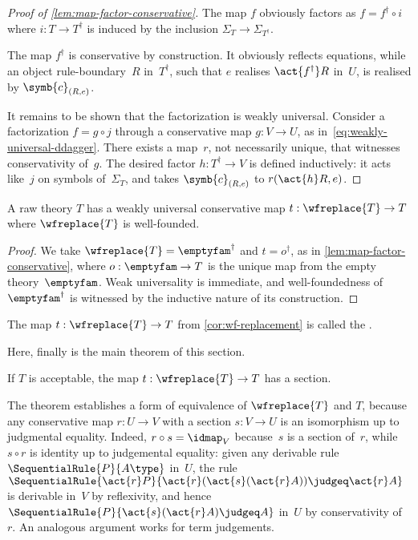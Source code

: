 \begin{proof}[Proof of \cref{lem:map-factor-conservative}]
  The map $f$ obviously factors as $f = f^\dagger \circ i$ where $i : T \to T^\dagger$ is induced by the inclusion $\Sigma_T \to \Sigma_{T^\dagger}$.

  The map $f^\dagger$ is conservative by construction. It obviously reflects equations, while an object rule-boundary~$R$
  in~$T^\dagger$, such that $e$ realises $\act{f^\dagger} R$ in~$U$, is realised by $\symb{c}_{(R, e)}$.

  It remains to be shown that the factorization is weakly universal. Consider a factorization $f = g \circ j$ through a conservative map $g : V \to U$, as in~\eqref{eq:weakly-universal-ddagger}. There exists a map~$r$, not necessarily unique, that witnesses conservativity of~$g$. The desired factor $h : T^\dagger \to V$ is defined inductively: it acts like~$j$ on symbols of~$\Sigma_T$, and takes $\symb{c}_{(R,e)}$ to $r(\act{h} R, e)$.
\end{proof}

\begin{corollary}
  \label{cor:wf-replacement}%
  A raw theory $T$ has a weakly universal conservative map $t : \wfreplace{T} \to T$
  where $\wfreplace{T}$ is well-founded.
\end{corollary}

\begin{proof}
  We take $\wfreplace{T} = \emptyfam^\dagger$ and $t = o^\dagger$,
  as in \cref{lem:map-factor-conservative},
  where $o : \emptyfam \to T$ is the unique map from the empty theory~$\emptyfam$.
  Weak universality is immediate, and well-foundedness of $\emptyfam^\dagger$ is witnessed by the inductive nature of its construction.
\end{proof}

\begin{definition}
  \label{def:wf-replacement}%
  The map $t : \wfreplace{T} \to T$ from \cref{cor:wf-replacement} is called the .
\end{definition}

Here, finally is the main theorem of this section.

\begin{theorem}
  \label{thm:wf-replacement-equivalence}%
  If $T$ is acceptable, the map $t : \wfreplace{T} \to T$ has a section.
\end{theorem}

The theorem establishes a form of equivalence of $\wfreplace{T}$ and $T$, because
any conservative map $r : U \to V$ with a section $s : V \to U$ is an isomorphism up to judgmental equality. Indeed, $r \circ s = \idmap_V$ because~$s$ is a section of~$r$, while $s \circ r$ is identity up to judgemental equality: given any derivable rule $\SequentialRule{P}{A \type}$ in~$U$, the rule $\SequentialRule{\act{r} P}{\act{r}(\act{s}(\act{r} A)) \judgeq \act{r} A}$ is derivable in~$V$ by reflexivity, and hence $\SequentialRule{P}{\act{s}(\act{r} A) \judgeq A}$ in~$U$ by conservativity of~$r$. An analogous argument works for term judgements.

